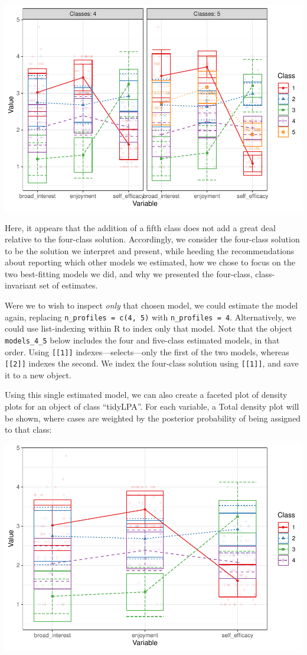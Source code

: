 \documentclass[english,man]{apa6}
\begin{document}
\includegraphics{paper_files/figure-latex/unnamed-chunk-8-1.pdf}

Here, it appears that the addition of a fifth class does not add a great deal relative to the four-class solution. Accordingly, we consider the four-class solution to be the solution we interpret and present, while heeding the recommendations about reporting which other models we estimated, how we chose to focus on the two best-fitting models we did, and why we presented the four-class, class-invariant set of estimates.

Were we to wish to inspect \emph{only} that chosen model, we could estimate the model again, replacing \texttt{n\_profiles\ =\ c(4,\ 5)} with \texttt{n\_profiles\ =\ 4}. Alternatively, we could use list-indexing within R to index only that model. Note that the object \texttt{models\_4\_5} below includes the four and five-class estimated models, in that order. Using \texttt{{[}{[}1{]}{]}} indexes---selects---only the first of the two models, whereas \texttt{{[}{[}2{]}{]}} indexes the second. We index the four-class solution using \texttt{{[}{[}1{]}{]}}, and save it to a new object.

Using this single estimated model, we can also create a faceted plot of density plots for an object of class \enquote{tidyLPA}. For each variable, a Total density plot will be shown, where cases are weighted by the posterior probability of being assigned to that class:

\includegraphics{paper_files/figure-latex/unnamed-chunk-10-1.pdf}
\end{document}
